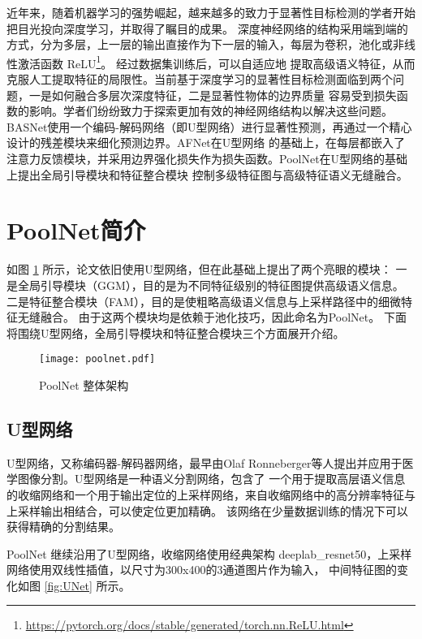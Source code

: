 近年来，随着机器学习的强势崛起，越来越多的致力于显著性目标检测的学者开始把目光投向深度学习，并取得了瞩目的成果。
深度神经网络的结构采用端到端的方式，分为多层，上一层的输出直接作为下一层的输入，每层为卷积，池化或非线性激活函数
ReLU\footnote{\url{https://pytorch.org/docs/stable/generated/torch.nn.ReLU.html}}。
经过数据集训练后，可以自适应地
提取高级语义特征，从而克服人工提取特征的局限性。当前基于深度学习的显著性目标检测面临到两个问题，一是如何融合多层次深度特征，二是显著性物体的边界质量
容易受到损失函数的影响。学者们纷纷致力于探索更加有效的神经网络结构以解决这些问题。
BASNet\cite{BASNet}使用一个编码-解码网络（即U型网络）进行显著性预测，再通过一个精心设计的残差模块来细化预测边界。AFNet\cite{AFNet}在U型网络
的基础上，在每层都嵌入了注意力反馈模块，并采用边界强化损失作为损失函数。PoolNet\cite{PoolNet}在U型网络的基础上提出全局引导模块和特征整合模块
控制多级特征图与高级特征语义无缝融合。

\section{PoolNet简介}

如图 \ref{fig:net} 所示，论文依旧使用U型网络，但在此基础上提出了两个亮眼的模块：
一是全局引导模块（GGM），目的是为不同特征级别的特征图提供高级语义信息。
二是特征整合模块（FAM），目的是使粗略高级语义信息与上采样路径中的细微特征无缝融合。
由于这两个模块均是依赖于池化技巧，因此命名为PoolNet。
下面将围绕U型网络，全局引导模块和特征整合模块三个方面展开介绍。

\begin{figure}[h]
\centering
\texttt{[image: poolnet.pdf]}
\caption{PoolNet 整体架构}
\label{fig:net}
\end{figure}

\subsection{U型网络}

U型网络，又称编码器-解码器网络，最早由Olaf Ronneberger\cite{U-Net}等人提出并应用于医学图像分割。U型网络是一种语义分割网络，包含了
一个用于提取高层语义信息的收缩网络和一个用于输出定位的上采样网络，来自收缩网络中的高分辨率特征与上采样输出相结合，可以使定位更加精确。
该网络在少量数据训练的情况下可以获得精确的分割结果。

PoolNet 继续沿用了U型网络，收缩网络使用经典架构 deeplab\_resnet50\cite{deeplab}\cite{resnet}，上采样网络使用双线性插值，以尺寸为300x400的3通道图片作为输入，
中间特征图的变化如图 \ref{fig:UNet} 所示。

